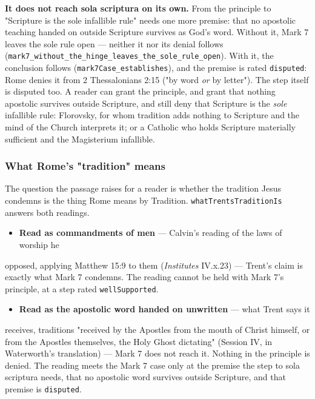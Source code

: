 \documentclass[11pt]{article}
\begin{document}
\textbf{It does not reach sola scriptura on its own.} From the principle to "Scripture is the sole infallible rule" needs one more premise: that no apostolic teaching handed on outside Scripture survives as God's word. Without it, Mark 7 leaves the sole rule open — neither it nor its denial follows (\texttt{mark7\_\allowbreak{}without\_\allowbreak{}the\_\allowbreak{}hinge\_\allowbreak{}leaves\_\allowbreak{}the\_\allowbreak{}sole\_\allowbreak{}rule\_\allowbreak{}open}). With it, the conclusion follows (\texttt{mark7\allowbreak{}Case\_\allowbreak{}establishes}), and the premise is rated \texttt{disputed}: Rome denies it from 2 Thessalonians 2:15 ("by word \emph{or} by letter"). The step itself is disputed too. A reader can grant the principle, and grant that nothing apostolic survives outside Scripture, and still deny that Scripture is the \emph{sole} infallible rule: Florovsky, for whom tradition adds nothing to Scripture and the mind of the Church interprets it; or a Catholic who holds Scripture materially sufficient and the Magisterium infallible.

\subsubsection*{What Rome's "tradition" means}
The question the passage raises for a reader is whether the tradition Jesus condemns is the thing Rome means by Tradition. \texttt{what\allowbreak{}Trents\allowbreak{}Tradition\allowbreak{}Is} answers both readings.

\begin{itemize}
  \item \textbf{Read as commandments of men} — Calvin's reading of the laws of worship he
\end{itemize}
  opposed, applying Matthew 15:9 to them (\emph{Institutes} IV.x.23) — Trent's claim   is exactly what Mark 7 condemns. The reading cannot be held with Mark 7's   principle, at a step rated \texttt{well\allowbreak{}Supported}.

\begin{itemize}
  \item \textbf{Read as the apostolic word handed on unwritten} — what Trent says it
\end{itemize}
  receives, traditions "received by the Apostles from the mouth of Christ   himself, or from the Apostles themselves, the Holy Ghost dictating" (Session   IV, in Waterworth's translation) — Mark 7 does not reach it. Nothing in the principle is denied.   The reading meets the Mark 7 case only at the premise the step to sola   scriptura needs, that no apostolic word survives outside Scripture, and that   premise is \texttt{disputed}.
\end{document}
